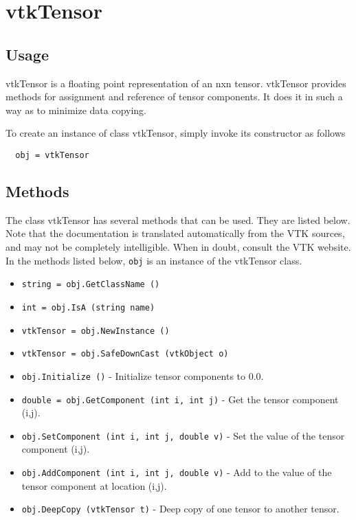 \section{vtkTensor}

\subsection{Usage}

 vtkTensor is a floating point representation of an nxn tensor. vtkTensor 
 provides methods for assignment and reference of tensor components. It 
 does it in such a way as to minimize data copying.


To create an instance of class vtkTensor, simply
invoke its constructor as follows
\begin{verbatim}
  obj = vtkTensor
\end{verbatim}
\subsection{Methods}

The class vtkTensor has several methods that can be used.
  They are listed below.
Note that the documentation is translated automatically from the VTK sources,
and may not be completely intelligible.  When in doubt, consult the VTK website.
In the methods listed below, \verb|obj| is an instance of the vtkTensor class.
\begin{itemize}
\item  \verb|string = obj.GetClassName ()|

\item  \verb|int = obj.IsA (string name)|

\item  \verb|vtkTensor = obj.NewInstance ()|

\item  \verb|vtkTensor = obj.SafeDownCast (vtkObject o)|

\item  \verb|obj.Initialize ()| -  Initialize tensor components to 0.0.

\item  \verb|double = obj.GetComponent (int i, int j)| -  Get the tensor component (i,j).

\item  \verb|obj.SetComponent (int i, int j, double v)| -  Set the value of the tensor component (i,j).

\item  \verb|obj.AddComponent (int i, int j, double v)| -  Add to the value of the tensor component at location (i,j).

\item  \verb|obj.DeepCopy (vtkTensor t)| -  Deep copy of one tensor to another tensor.

\end{itemize}
